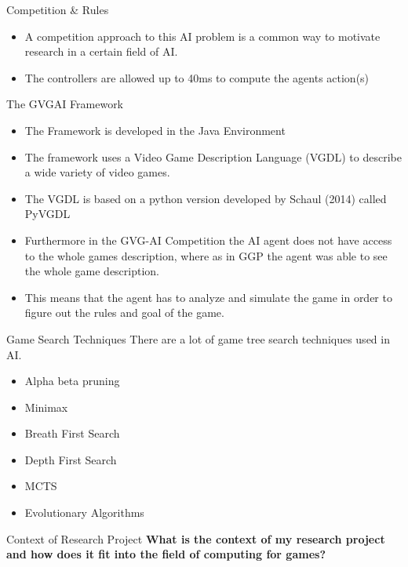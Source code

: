 \documentclass{beamer}
\begin{document}
\begin{frame}{Competition \& Rules}		
			\begin{itemize}
			\item A competition approach to this AI problem is a common way to motivate research in a certain field of AI. \pause
			\item The controllers are allowed up to 40ms to compute the agents action(s)  \pause

		\end{itemize}
\end{frame}


\begin{frame}{The GVGAI Framework}		
			\begin{itemize}
			\item The Framework is developed in the Java Environment \pause
			\item The framework uses a Video Game Description Language (VGDL) to describe a wide variety of video games. \pause
			\item The VGDL is based on a python version developed by Schaul (2014) called PyVGDL \pause
			\item  Furthermore in the GVG-AI Competition the AI agent does not have access to the whole games description, where as in GGP the agent was able to see the whole game description. \pause
			\item  This means that the agent has to analyze and simulate the game in order to figure out the rules and goal of the game. \pause
		\end{itemize}
\end{frame}

\begin{frame}{Game Search Techniques}
		There are a lot of game tree search techniques used in AI. 
			\begin{itemize}
			\item Alpha beta pruning \pause
			\item Minimax \pause
			\item Breath First Search \pause
			\item Depth First Search \pause
			\item MCTS \pause
			\item Evolutionary Algorithms \pause
		\end{itemize}
\end{frame}

\begin{frame}{Context of Research Project}
	\textbf{What is the context of my research project and how does it fit into the field of computing for games?}
	
	
\end{frame}
\end{document}
